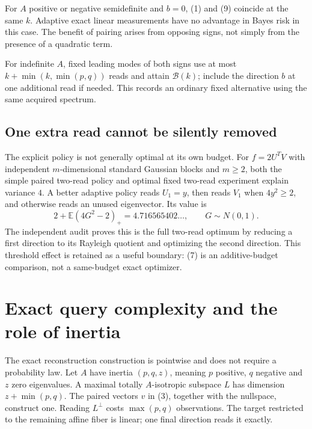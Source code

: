 \documentclass[11pt,a4paper]{article}
\newcommand{\E}{\mathbb E}\newcommand{\Var}{\operatorname{Var}}
\begin{document}
For $A$ positive or negative semidefinite and $b=0$, (1) and (9) coincide at the same $k$. Adaptive exact linear measurements have no advantage in Bayes risk in this case. The benefit of pairing arises from opposing signs, not simply from the presence of a quadratic term.

For indefinite $A$, fixed leading modes of both signs use at most
$k+\min(k,\min(p,q))$ reads and attain $\mathcal B(k)$; include the direction $b$ at one additional read if needed. This records an ordinary fixed alternative using the same acquired spectrum.

\subsection{One extra read cannot be silently removed}

The explicit policy is not generally optimal at its own budget. For $f=2U^TV$ with independent $m$-dimensional standard Gaussian blocks and $m\ge2$, both the simple paired two-read policy and optimal fixed two-read experiment explain variance $4$. A better adaptive policy reads $U_1=y$, then reads $V_1$ when $4y^2\ge2$, and otherwise reads an unused eigenvector. Its value is
\[
 2+\E(4G^2-2)_+=4.716565402\ldots,\qquad G\sim N(0,1).
\]
The independent audit proves this is the full two-read optimum by reducing a first direction to its Rayleigh quotient and optimizing the second direction. This threshold effect is retained as a useful boundary: (7) is an additive-budget comparison, not a same-budget exact optimizer.

\section{Exact query complexity and the role of inertia}

The exact reconstruction construction is pointwise and does not require a probability law. Let $A$ have inertia $(p,q,z)$, meaning $p$ positive, $q$ negative and $z$ zero eigenvalues. A maximal totally $A$-isotropic subspace $L$ has dimension $z+\min(p,q)$. The paired vectors $v$ in (3), together with the nullspace, construct one. Reading $L^\perp$ costs $\max(p,q)$ observations. The target restricted to the remaining affine fiber is linear; one final direction reads it exactly.
\end{document}
